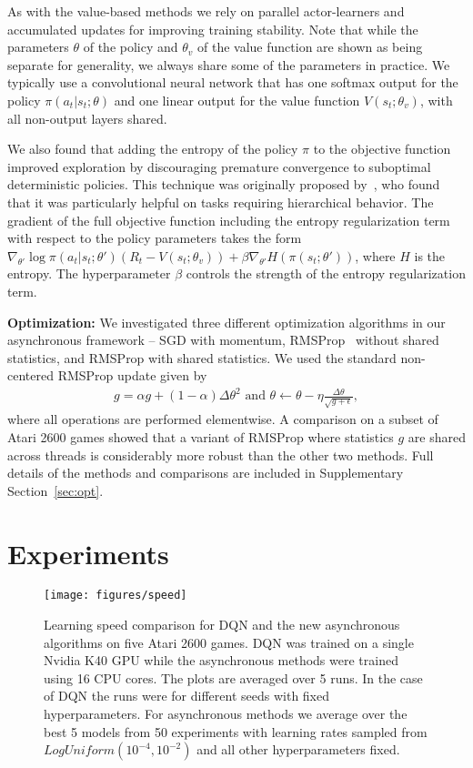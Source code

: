 \documentclass{article} \usepackage{times}
\begin{document}
As with the value-based methods we rely on parallel actor-learners and accumulated updates for improving training stability.
Note that while the parameters $\theta$ of the policy and $\theta_v$ of the value function are shown as being separate for generality, we always share some of the parameters in practice.
We typically use a convolutional neural network that has one softmax output for the policy $\pi(a_t|s_t;\theta)$ and one linear output for the value function $V(s_t;\theta_v)$, with all non-output layers shared.

We also found that adding the entropy of the policy $\pi$ to the objective function improved exploration by discouraging premature convergence to suboptimal deterministic policies.
This technique was originally proposed by~\citep{williams1991function}, who found that it was particularly helpful on tasks requiring hierarchical behavior.
The gradient of the full objective function including the entropy regularization term with respect to the policy parameters takes the form
$\nabla_{\theta'} \log\pi(a_t|s_t;\theta') (R_t - V(s_t;\theta_v)) + \beta \nabla_{\theta'} H(\pi(s_t;\theta'))$,
where $H$ is the entropy.  The hyperparameter $\beta$ controls the strength of the entropy regularization term.


\textbf{Optimization:}
We investigated three different optimization algorithms in our asynchronous framework -- SGD with momentum, RMSProp~\citep{tieleman2012lecture} without shared statistics, and RMSProp with shared statistics.
We used the standard non-centered RMSProp update given by
\begin{eqnarray}
\label{eq-rmsprop}
g = \alpha g + (1-\alpha)\Delta\theta^2 \text{ and } \theta \gets \theta - \eta \frac{\Delta\theta}{\sqrt{g+\epsilon}},
\end{eqnarray}
where all operations are performed elementwise.
A comparison on a subset of Atari 2600 games showed that a variant of RMSProp where statistics $g$ are shared across threads is considerably more robust than the other two methods.
Full details of the methods and comparisons are included in Supplementary Section~\ref{sec:opt}.
 \vspace{-0.1cm}
\section{Experiments}
\label{sec:experiments}
\begin{figure*}[t]
\begin{center}
\texttt{[image: figures/speed]}
\caption{\label{fig-speed} Learning speed comparison for DQN and the new asynchronous algorithms on five Atari 2600 games. DQN was trained on a single Nvidia K40 GPU while the asynchronous methods were trained using 16 CPU cores. The plots are averaged over 5 runs.  In the case of DQN the runs were for different seeds with fixed hyperparameters.  For asynchronous methods we average over the best 5 models from 50 experiments with learning rates sampled from $LogUniform(10^{-4},10^{-2})$ and all other hyperparameters fixed.}
\end{center}
\vspace{-0.45cm}
\end{figure*}
\end{document}
